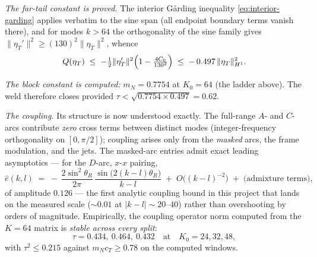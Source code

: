 \documentclass[11pt]{amsart}
\theoremstyle{plain}
\theoremstyle{definition}
\begin{document}
\emph{The far-tail constant is proved.}  The interior G\aa rding
inequality \eqref{eq:interior-garding} applies verbatim to the sine
span (all endpoint boundary terms vanish there), and for modes
$k > 64$ the orthogonality of the sine family gives
$\|\eta_{T}'\|^{2}\geq(130)^{2}\|\eta_{T}\|^{2}$, whence
\begin{equation}\label{eq:cT}
   Q(\eta_{T}) \;\leq\;
   -\tfrac12\|\eta_{T}'\|^{2}\Bigl(1-\tfrac{4C_{0}}{130^{2}}\Bigr)
   \;\leq\; -\,0.497\,\|\eta_{T}\|^{2}_{H^{1}} .
\end{equation}

\emph{The block constant is computed:} $m_{N} = 0.7754$ at
$K_{0}=64$ (the ladder above).  The weld therefore closes provided
$\tau < \sqrt{0.7754\times0.497} = 0.62$.

\emph{The coupling.}  Its structure is now understood exactly.  The
full-range $A$- and $C$-arcs contribute \emph{zero} cross terms
between distinct modes (integer-frequency orthogonality on
$[0,\pi/2]$); coupling arises only from the \emph{masked} arcs, the
frame modulation, and the jets.  The masked-arc entries admit exact
leading asymptotics --- for the $D$-arc, $x$-$x$ pairing,
\begin{equation}\label{eq:entry-asymp}
   \hat e(k,l) \;=\;
   -\,\frac{2\sin^{2}\theta_{R}}{2\pi}\,
   \frac{\sin\bigl(2(k-l)\theta_{R}\bigr)}{k-l}
   \;+\; O\!\bigl((k-l)^{-2}\bigr)
   \;+\;\text{(admixture terms)},
\end{equation}
of amplitude $0.126$ --- the first analytic coupling bound in this
project that lands on the measured scale ($\sim0.01$ at
$|k-l|\sim20$--$40$) rather than overshooting by orders of
magnitude.  Empirically, the coupling operator norm computed from
the $K=64$ matrix is \emph{stable across every split}:
\[
   \tau = 0.434,\ 0.464,\ 0.432
   \quad\text{at}\quad K_{0} = 24, 32, 48,
\]
with $\tau^{2} \leq 0.215$ against $m_{N}c_{T} \geq 0.78$ on the
computed windows.
\end{document}
